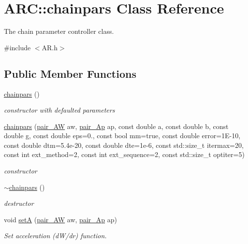 \hypertarget{classARC_1_1chainpars}{}\section{A\+RC\+:\+:chainpars Class Reference}
\label{classARC_1_1chainpars}


The chain parameter controller class.  




{\ttfamily \#include $<$A\+R.\+h$>$}

\subsection*{Public Member Functions}
\begin{DoxyCompactItemize}
\item 
\hyperlink{classARC_1_1chainpars_a2019a609d85e2b801f306ac8c7f268ab}{chainpars} ()
\begin{DoxyCompactList}\small\item\em constructor with defaulted parameters \end{DoxyCompactList}\item 
\hyperlink{classARC_1_1chainpars_a6495ce7c673679d5768e309887e0d502}{chainpars} (\hyperlink{namespaceARC_adbfc7c72ce3d25363148027db0641abf}{pair\+\_\+\+AW} aw, \hyperlink{namespaceARC_a819446c4644b3a3af7ef11574d0b55e0}{pair\+\_\+\+Ap} ap, const double a, const double b, const double g, const double eps=0., const bool mm=true, const double error=1\+E-\/10, const double dtm=5.\+4e-\/20, const double dte=1e-\/6, const std\+::size\+\_\+t itermax=20, const int ext\+\_\+method=2, const int ext\+\_\+sequence=2, const std\+::size\+\_\+t optiter=5)
\begin{DoxyCompactList}\small\item\em constructor \end{DoxyCompactList}\item 
\hyperlink{classARC_1_1chainpars_a032873f782645efb6e60dc77f6d425dc}{$\sim$chainpars} ()
\begin{DoxyCompactList}\small\item\em destructor \end{DoxyCompactList}\item 
void \hyperlink{classARC_1_1chainpars_af639f7bc8cfbb2a0330f079df2fd556e}{setA} (\hyperlink{namespaceARC_adbfc7c72ce3d25363148027db0641abf}{pair\+\_\+\+AW} aw, \hyperlink{namespaceARC_a819446c4644b3a3af7ef11574d0b55e0}{pair\+\_\+\+Ap} ap)
\begin{DoxyCompactList}\small\item\em Set acceleration (d\+W/dr) function. \end{DoxyCompactList}\item 

\end{DoxyCompactItemize}
